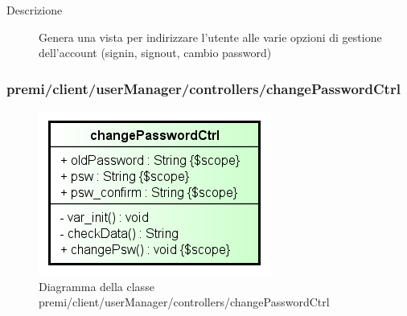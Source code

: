 \begin{description}
\item[Descrizione] \hfill
	Genera una vista per indirizzare l'utente alle varie opzioni di gestione dell'account (signin, signout, cambio password)
\end{description}

















\subsubsection{premi/client/userManager/controllers/changePasswordCtrl}
\begin{figure}[H]
\begin{center}
\includegraphics[scale=0.85]{img/diacla/changePasswordCtrl.png}
\caption{Diagramma della classe premi/client/userManager/controllers/changePasswordCtrl}
\end{center}
\end{figure}


